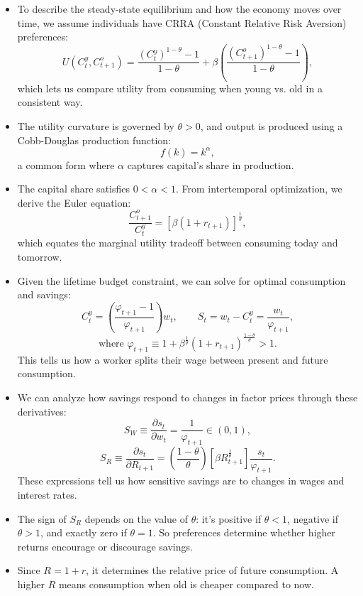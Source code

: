 \documentclass[12pt]{article}
\begin{document}
\begin{itemize}
\item To describe the steady-state equilibrium and how the economy moves over time, we assume individuals have CRRA (Constant Relative Risk Aversion) preferences:
\[
U(C_t^y, C_{t+1}^o) = \frac{(C_t^y)^{1 - \theta} - 1}{1 - \theta} + \beta \left( \frac{(C_{t+1}^o)^{1 - \theta} - 1}{1 - \theta} \right),
\]
which lets us compare utility from consuming when young vs. old in a consistent way.

\item The utility curvature is governed by \( \theta > 0 \), and output is produced using a Cobb-Douglas production function:
\[
f(k) = k^\alpha,
\]
a common form where \( \alpha \) captures capital's share in production.

\item The capital share satisfies \( 0 < \alpha < 1 \). From intertemporal optimization, we derive the Euler equation:
\[
\frac{C_{t+1}^o}{C_t^y} = \left[ \beta (1 + r_{t+1}) \right]^{\frac{1}{\theta}},
\]
which equates the marginal utility tradeoff between consuming today and tomorrow.

\item Given the lifetime budget constraint, we can solve for optimal consumption and savings:
\[
C_t^y = \left( \frac{\varphi_{t+1} - 1}{\varphi_{t+1}} \right) w_t, \qquad S_t = w_t - C_t^y = \frac{w_t}{\varphi_{t+1}},
\]
\[
\text{where } \varphi_{t+1} \equiv 1 + \beta^{\frac{1}{\theta}} (1 + r_{t+1})^{\frac{1 - \theta}{\theta}} > 1.
\]
This tells us how a worker splits their wage between present and future consumption.

\item We can analyze how savings respond to changes in factor prices through these derivatives:
\[
S_W \equiv \frac{\partial s_t}{\partial w_t} = \frac{1}{\varphi_{t+1}} \in (0,1),
\]
\[
S_R \equiv \frac{\partial s_t}{\partial R_{t+1}} = \left( \frac{1 - \theta}{\theta} \right) \left[ \beta R_{t+1}^{\frac{1}{\theta}} \right] \frac{s_t}{\varphi_{t+1}}.
\]
These expressions tell us how sensitive savings are to changes in wages and interest rates.

\item The sign of \( S_R \) depends on the value of \( \theta \): it's positive if \( \theta < 1 \), negative if \( \theta > 1 \), and exactly zero if \( \theta = 1 \). So preferences determine whether higher returns encourage or discourage savings.

\item Since \( R = 1 + r \), it determines the relative price of future consumption. A higher \( R \) means consumption when old is cheaper compared to now.


\end{itemize}
\end{document}
